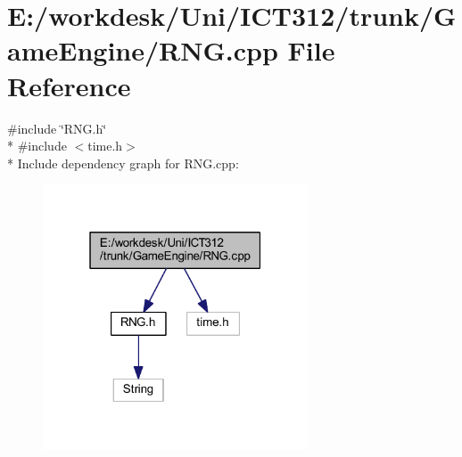 \section{E\+:/workdesk/\+Uni/\+I\+C\+T312/trunk/\+Game\+Engine/\+R\+N\+G.cpp File Reference}
\label{_r_n_g_8cpp}
{\ttfamily \#include \char`\"{}R\+N\+G.\+h\char`\"{}}\\*
{\ttfamily \#include $<$time.\+h$>$}\\*
Include dependency graph for R\+N\+G.\+cpp\+:\nopagebreak
\begin{figure}[H]
\begin{center}
\leavevmode
\includegraphics[width=223pt]{da/d50/_r_n_g_8cpp__incl}
\end{center}
\end{figure}
